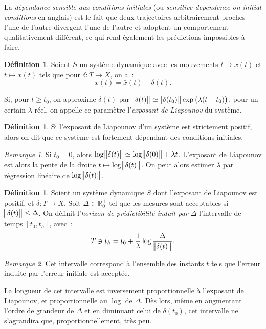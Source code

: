 \documentclass{article}
\theoremstyle{definition}
\newtheorem{déf}[thm]{Définition}
\theoremstyle{remark}
\newtheorem*{rmq}{Remarque}
\newcommand{\R}{\mathbb R}
\begin{document}
	La \textit{dépendance sensible aux conditions initiales} (ou \textit{sensitive dependence on initial conditions} en anglais) est le fait que deux trajectoires
	arbitrairement proches l'une de l'autre divergent l'une de l'autre et adoptent un comportement qualitativement différent, ce qui rend également les
	prédictions impossibles à faire.

	\begin{déf} Soient $S$ un système dynamique avec les mouvements $t \mapsto x(t)$ et $t \mapsto \bar x(t)$ tels que pour $\delta : T \to X$, on a~:
	\[x(t) = \bar x(t) - \delta(t).\]

	Si, pour $t \geq t_0$, on approxime $\delta(t)$ par $\norm {\delta(t)} \simeq \norm {\delta(t_0)}\exp\left(\lambda(t-t_0)\right)$, pour un certain $\lambda$
	réel, on appelle ce paramètre l'\textit{exposant de Liapounov} du système.
	\end{déf}

	\begin{déf} Si l'exposant de Liapounov d'un système est strictement positif, alors on dit que ce système est fortement dépendant des conditions initiales.
	\end{déf}

	\begin{rmq} Si $t_0 = 0$, alors $\log \norm {\delta(t)} \simeq \log \norm {\delta(0)} + \lambda t$. L'exposant de Liapounov est alors la pente de la droite
	$t \mapsto \log \norm {\delta(t)}$. On peut alors estimer $\lambda$ par régression linéaire de $\log \norm {\delta(t)}$.
	\end{rmq}

	\begin{déf} Soient un système dynamique $S$ dont l'exposant de Liapounov est positif, et $\delta : T \to X$. Soit $\Delta \in \R_0^+$ tel que les mesures
	sont acceptables si $\norm {\delta(t)} \leq \Delta$. On définit l'\textit{horizon de prédictibilité induit par $\Delta$} l'intervalle de temps $[t_0, t_h]$,
	avec~:
	\[T \ni t_h = t_0 + \frac 1\lambda \log\frac \Delta{\norm {\delta(t)}}.\]
	\end{déf}

	\begin{rmq} Cet intervalle correspond à l'ensemble des instants $t$ tels que l'erreur induite par l'erreur initiale est acceptée.

	La longueur de cet intervalle est inversement proportionnelle à l'exposant de Liapounov, et proportionnelle au $\log$ de $\Delta$. Dès lors, même en
	augmentant l'ordre de grandeur de $\Delta$ et en diminuant celui de $\delta(t_0)$, cet intervalle ne s'agrandira que, proportionnellement, très peu.
	\end{rmq}
\end{document}
